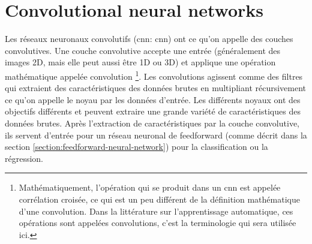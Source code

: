 \section{Convolutional neural networks}
\label{section:cnn}
Les réseaux neuronaux convolutifs (\acrlong{cnn}: \acrshort{cnn}) ont ce qu'on appelle des couches convolutives. Une couche convolutive accepte une entrée (généralement des images 2D, mais elle peut aussi être 1D ou 3D) et applique une opération mathématique appelée convolution \footnote{Mathématiquement, l'opération qui se produit dans un \acrshort{cnn} est appelée corrélation croisée, ce qui est un peu différent de la définition mathématique d'une convolution. Dans la littérature sur l'apprentissage automatique, ces opérations sont appelées convolutions, c'est la terminologie qui sera utilisée ici.}. Les convolutions agissent comme des filtres qui extraient des caractéristiques des données brutes en multipliant récursivement ce qu'on appelle le noyau par les données d'entrée.
Les différents noyaux ont des objectifs différents et peuvent extraire une grande variété de caractéristiques des données brutes. Après l'extraction de caractéristiques par la couche convolutive, ils servent d'entrée pour un réseau neuronal de feedforward (comme décrit dans la section \ref{section:feedforward-neural-network}) pour la classification ou la régression.

